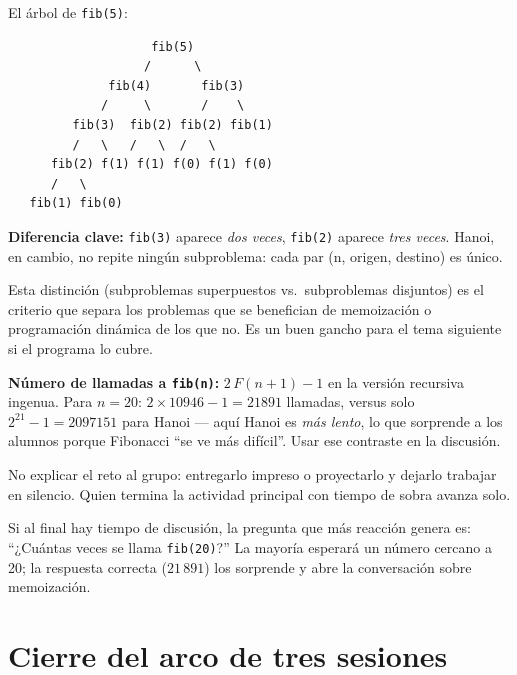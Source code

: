 \documentclass[12pt, oneside]{article}
\begin{document}
\begin{notaprofesor}
  El árbol de \texttt{fib(5)}:

\begin{verbatim}
                    fib(5)
                   /      \
              fib(4)       fib(3)
             /     \       /    \
         fib(3)  fib(2) fib(2) fib(1)
         /   \   /   \  /   \
      fib(2) f(1) f(1) f(0) f(1) f(0)
      /   \
   fib(1) fib(0)
\end{verbatim}

  \textbf{Diferencia clave:} \texttt{fib(3)} aparece \textit{dos veces},
  \texttt{fib(2)} aparece \textit{tres veces}.  Hanoi, en cambio, no
  repite ningún subproblema: cada par (n, origen, destino) es único.

  Esta distinción (subproblemas superpuestos vs.\ subproblemas disjuntos)
  es el criterio que separa los problemas que se benefician de memoización
  o programación dinámica de los que no.  Es un buen gancho para el tema
  siguiente si el programa lo cubre.

  \textbf{Número de llamadas a \texttt{fib(n)}:}
  $2\,F(n+1) - 1$ en la versión recursiva ingenua.
  Para $n = 20$: $2 \times 10946 - 1 = 21891$ llamadas,
  versus solo $2^{21} - 1 = 2097151$ para Hanoi — aquí Hanoi
  es \textit{más lento}, lo que sorprende a los alumnos porque
  Fibonacci ``se ve más difícil''.  Usar ese contraste en la discusión.
\end{notaprofesor}

\begin{notaprofesor}[Cómo presentar el reto en clase]
  No explicar el reto al grupo: entregarlo impreso o proyectarlo y dejarlo
  trabajar en silencio.  Quien termina la actividad principal con tiempo
  de sobra avanza solo.

  Si al final hay tiempo de discusión, la pregunta que más reacción genera
  es: ``¿Cuántas veces se llama \texttt{fib(20)}?''  La mayoría esperará
  un número cercano a 20; la respuesta correcta ($21\,891$) los sorprende
  y abre la conversación sobre memoización.
\end{notaprofesor}

\section{Cierre del arco de tres sesiones}
\end{document}
